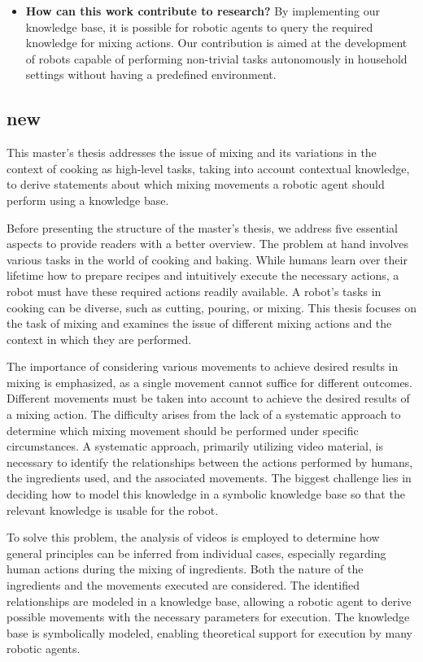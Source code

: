 \begin{itemize}
    \item \textbf{How can this work contribute to research?} By implementing our knowledge base, it is possible for robotic agents to query the required knowledge for mixing actions. Our contribution is aimed at the development of robots capable of performing non-trivial tasks autonomously in household settings without having a predefined environment.
\end{itemize}

\subsection{new}
This master's thesis addresses the issue of mixing and its variations in the context of cooking as high-level tasks, taking into account contextual knowledge, to derive statements about which mixing movements a robotic agent should perform using a knowledge base.

Before presenting the structure of the master's thesis, we address five essential aspects to provide readers with a better overview. The problem at hand involves various tasks in the world of cooking and baking. While humans learn over their lifetime how to prepare recipes and intuitively execute the necessary actions, a robot must have these required actions readily available. A robot's tasks in cooking can be diverse, such as cutting, pouring, or mixing. This thesis focuses on the task of mixing and examines the issue of different mixing actions and the context in which they are performed. 

The importance of considering various movements to achieve desired results in mixing is emphasized, as a single movement cannot suffice for different outcomes. Different movements must be taken into account to achieve the desired results of a mixing action. The difficulty arises from the lack of a systematic approach to determine which mixing movement should be performed under specific circumstances. A systematic approach, primarily utilizing video material, is necessary to identify the relationships between the actions performed by humans, the ingredients used, and the associated movements. The biggest challenge lies in deciding how to model this knowledge in a symbolic knowledge base so that the relevant knowledge is usable for the robot.

To solve this problem, the analysis of videos is employed to determine how general principles can be inferred from individual cases, especially regarding human actions during the mixing of ingredients. Both the nature of the ingredients and the movements executed are considered. The identified relationships are modeled in a knowledge base, allowing a robotic agent to derive possible movements with the necessary parameters for execution. The knowledge base is symbolically modeled, enabling theoretical support for execution by many robotic agents.

